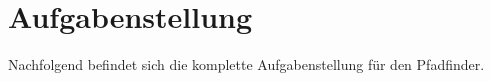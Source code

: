 \section{Aufgabenstellung} \label{aufgabenstellung}

Nachfolgend befindet sich die komplette Aufgabenstellung für den Pfadfinder.

